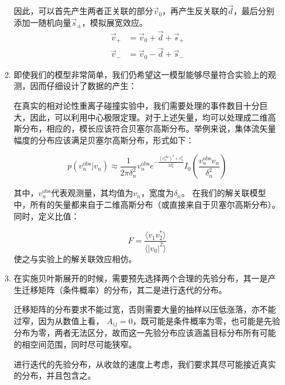 \documentclass[aps,pre,12pt,preprint,onecolumn,showpacs,showkeys]{revtex4-1}
\begin{document}
\begin{enumerate}
\begin{enumerate}
        因此，可以首先产生两者正关联的部分$\vec{v}_0$，再产生反关联的$\vec{d}$，最后分别添加一随机向量$\vec{s}_\pm$，模拟展宽效应。
        \begin{equation}
            \begin{aligned}
                \vec{v}_+&=\vec{v}_0+\vec{d}+\vec{s}_+\\
                \vec{v}_-&=\vec{v}_0-\vec{d}+\vec{s}_-
            \end{aligned}
        \end{equation}
        \item 即使我们的模型非常简单，我们仍希望这一模型能够尽量符合实验上的观测，因而仔细设计了数据的产生：\par
        在真实的相对论性重离子碰撞实验中，我们需要处理的事件数目十分巨大，因此，可以利用中心极限定理。对于上述矢量，均可以处理成二维高斯分布，相应的，模长应该符合贝塞尔高斯分布。举例来说，集体流矢量幅度的分布应该满足贝塞尔高斯分布\cite{PhysRevD.46.229,VOLOSHIN2008537}，形式如下：\par
        \begin{equation}
            p\left(v_{n}^{\mathrm{obs}} | v_{n}\right) \approx \frac{1}{2 \pi \delta_{n}^{2}} v_{n}^{\mathrm{obs}} e^{-\frac{\left(v_{n}^{\mathrm{obs}}\right)^{2}+v_{n}^{2}}{2 \delta_{n}^{2}}} I_{0}\left(\frac{v_{n}^{\mathrm{obs}} v_{n}}{\delta_{n}^{2}}\right)
        \end{equation}
        \par
        其中，$v_{n}^{\mathrm{obs}}$代表观测量，其均值为$v_n$，宽度为$\delta_n$。
        在我们的解关联模型中，所有的矢量都来自于二维高斯分布（或直接来自于贝塞尔高斯分布）。同时，定义比值：\par
        \begin{equation}
            F=\frac{\langle v_1v_2^*\rangle}{\langle|v_0|^2\rangle}
        \end{equation}
        使之与实验上的解关联效应相仿\cite{PhysRevC.95.064914,Aaboud2018}。
        \item 在实施贝叶斯展开的时候，需要预先选择两个合理的先验分布，其一是产生迁移矩阵（条件概率）的分布，其二是进行迭代的分布。\par
        迁移矩阵的分布要求不能过宽，否则需要大量的抽样以压低涨落，亦不能过窄，因为从数值上看，
        $A_{ij}=0$，既可能是条件概率为零，也可能是先验分布为零，两者无法区分，故而这一先验分布应该涵盖目标分布所有可能的相空间范围，同时尽可能狭窄。\par
        进行迭代的先验分布，从收敛的速度上考虑，我们要求其尽可能接近真实的分布，并且包含之。\par

\end{enumerate}
\end{enumerate}
\end{document}
